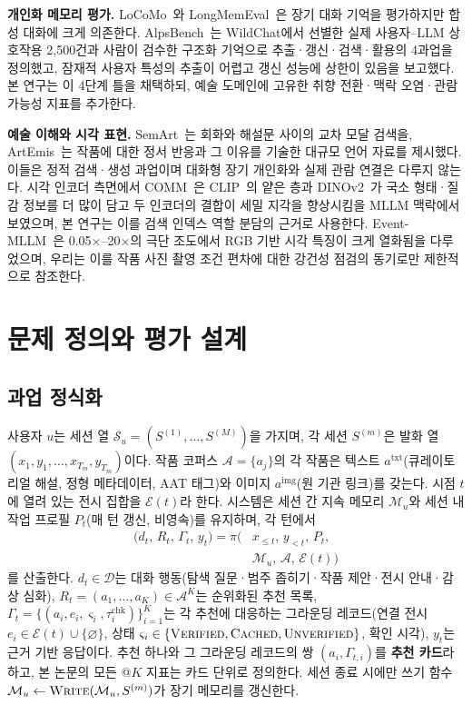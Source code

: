 \documentclass[10pt,twocolumn,letterpaper]{article}
\newcommand{\cA}{\mathcal{A}}
\newcommand{\cE}{\mathcal{E}}
\newcommand{\cM}{\mathcal{M}}
\newcommand{\cD}{\mathcal{D}}
\newcommand{\cS}{\mathcal{S}}
\newcommand{\op}[1]{\textsc{#1}}
\begin{document}
\textbf{개인화 메모리 평가.} LoCoMo~\cite{maharana2024locomo}와 LongMemEval~\cite{wu2025longmemeval}은 장기 대화 기억을 평가하지만 합성 대화에 크게 의존한다. AlpsBench~\cite{xiao2026alpsbench}는 WildChat에서 선별한 실제 사용자–LLM 상호작용 2,500건과 사람이 검수한 구조화 기억으로 추출·갱신·검색·활용의 4과업을 정의했고, 잠재적 사용자 특성의 추출이 어렵고 갱신 성능에 상한이 있음을 보고했다. 본 연구는 이 4단계 틀을 채택하되, 예술 도메인에 고유한 취향 전환·맥락 오염·관람 가능성 지표를 추가한다.

\textbf{예술 이해와 시각 표현.} SemArt~\cite{garcia2018semart}는 회화와 해설문 사이의 교차 모달 검색을, ArtEmis~\cite{achlioptas2021artemis}는 작품에 대한 정서 반응과 그 이유를 기술한 대규모 언어 자료를 제시했다. 이들은 정적 검색·생성 과업이며 대화형 장기 개인화와 실제 관람 연결은 다루지 않는다. 시각 인코더 측면에서 COMM~\cite{jiang2023clip2dino}은 CLIP~\cite{radford2021clip}의 얕은 층과 DINOv2~\cite{oquab2023dinov2}가 국소 형태·질감 정보를 더 많이 담고 두 인코더의 결합이 세밀 지각을 향상시킴을 MLLM 맥락에서 보였으며, 본 연구는 이를 검색 인덱스 역할 분담의 근거로 사용한다. Event-MLLM~\cite{zhang2026eventmllm}은 0.05×–20×의 극단 조도에서 RGB 기반 시각 특징이 크게 열화됨을 다루었으며, 우리는 이를 작품 사진 촬영 조건 편차에 대한 강건성 점검의 동기로만 제한적으로 참조한다.

\section{문제 정의와 평가 설계}

\subsection{과업 정식화}
사용자 $u$는 세션 열 $\cS_u=(S^{(1)},\dots,S^{(M)})$을 가지며, 각 세션 $S^{(m)}$은 발화 열 $(x_1,y_1,\dots,x_{T_m},y_{T_m})$이다. 작품 코퍼스 $\cA=\{a_j\}$의 각 작품은 텍스트 $a^{\mathrm{txt}}$(큐레이토리얼 해설, 정형 메타데이터, AAT 태그)와 이미지 $a^{\mathrm{img}}$(원 기관 링크)를 갖는다. 시점 $t$에 열려 있는 전시 집합을 $\cE(t)$라 한다. 시스템은 세션 간 지속 메모리 $\cM_u$와 세션 내 작업 프로필 $P_t$(매 턴 갱신, 비영속)를 유지하며, 각 턴에서
\begin{equation}
\begin{aligned}
\bigl(d_t,\,R_t,\,\Gamma_t,\,y_t\bigr)=\pi\bigl(&x_{\le t},\,y_{<t},\,P_t,\\
&\cM_u,\,\cA,\,\cE(t)\bigr)
\end{aligned}
\label{eq:task}
\end{equation}
를 산출한다. $d_t\in\cD$는 대화 행동(탐색 질문·범주 좁히기·작품 제안·전시 안내·감상 심화), $R_t=(a_1,\dots,a_K)\in\cA^K$는 순위화된 추천 목록, $\Gamma_t=\{(a_i,e_i,\varsigma_i,\tau^{\mathrm{chk}}_i)\}_{i=1}^{K}$는 각 추천에 대응하는 그라운딩 레코드(연결 전시 $e_i\in\cE(t)\cup\{\varnothing\}$, 상태 $\varsigma_i\in\{\textsc{Verified},\textsc{Cached},\textsc{Unverified}\}$, 확인 시각), $y_t$는 근거 기반 응답이다. 추천 하나와 그 그라운딩 레코드의 쌍 $(a_i,\Gamma_{t,i})$를 \textbf{추천 카드}라 하고, 본 논문의 모든 @$K$ 지표는 카드 단위로 정의한다. 세션 종료 시에만 쓰기 함수 $\cM_u\leftarrow\op{Write}(\cM_u,S^{(m)})$가 장기 메모리를 갱신한다.
\end{document}
